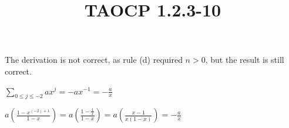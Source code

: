 \documentclass{article}
\title{TAOCP 1.2.3\mbox{-}10}
\begin{document}
\maketitle

The derivation is not correct, as rule (d) required \( n > 0 \), but the result is still correct.

\( \sum_{0 \leq j \leq -2} ax^{j} = -ax^{-1} = -\frac{a}{x} \)

\( a(\frac{1-x^{(-2)+1}}{1-x}) = a(\frac{1-\frac{1}{x}}{1-x}) = a(\frac{x-1}{x(1-x)}) = -\frac{a}{x} \)
\end{document}
